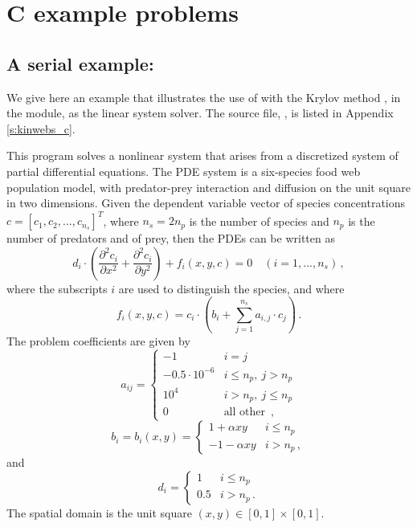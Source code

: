\section{C example problems}\label{s:ex_c}

\subsection{A serial example: }\label{ss:kinwebs}

We give here an example that illustrates the use of {\kinsol} with the Krylov
method {\spgmr}, in the {\kinspgmr} module, as the linear system solver.
The source file, , is listed in Appendix \ref{s:kinwebs_c}.

This program solves a nonlinear system that arises from a discretized system of partial
differential equations. The PDE system is a six-species food web population
model, with predator-prey interaction and diffusion on the unit square in
two dimensions. Given the dependent variable vector of species concentrations
$c = [c_1, c_2,..., c_{n_s}]^T$, where $n_s = 2 n_p$ is the number of species 
and $n_p$ is the number of predators and of prey, then
the PDEs can be written as
\begin{equation}\label{e:kinwebs_pde}
  d_i \cdot \left( \frac{\partial^2 c_i}{\partial x^2} + 
    \frac{\partial^2 c_i}{\partial y^2} \right) + f_i(x,y,c) = 0
  \quad (i=1,...,n_s) \, ,
\end{equation}
where the subscripts $i$ are used to distinguish the species, and where
\begin{equation}\label{e:kinwebs_fterm}
f_i(x,y,c) = c_i \cdot \left(b_i + \sum_{j=1}^{n_s} a_{i,j} \cdot c_j \right) \, .
\end{equation}
The problem coefficients are given by
\begin{equation*}
  a_{ij} = 
  \begin{cases}
    -1                 & i=j \\
    -0.5 \cdot 10^{-6} & i \leq n_p , ~ j > n_p  \\
    10^4               & i > n_p , ~ j \leq n_p  \\
    0                  & \mbox{all other } \, ,
  \end{cases}
\end{equation*}
\begin{equation*}
  b_i = b_i(x,y) = 
  \begin{cases}
    1 + \alpha xy   & i \leq n_p  \\
    -1 - \alpha xy   & i > n_p \, ,
  \end{cases}
\end{equation*}
and
\begin{equation*}
  d_i = 
  \begin{cases}
    1 & i \leq n_p  \\
    0.5 & i > n_p  \, .
  \end{cases}
\end{equation*}
The spatial domain is the unit square $(x,y) \in [0,1] \times [0,1]$.

